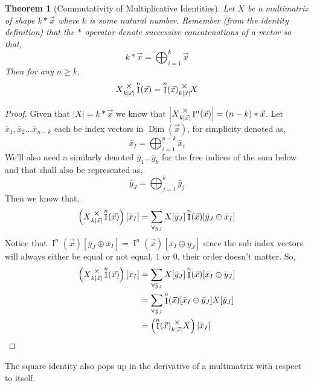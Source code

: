 \documentclass[12pt]{book}
\theoremstyle{plain}
\newtheorem{theorem}{Theorem}[chapter]
\theoremstyle{definition}
\theoremstyle{ppart}
\theoremstyle{case}
\theoremstyle{solution}
\DeclareMathOperator{\Dim}{Dim}
\DeclareMathOperator{\Ident}{I}
\newcommand{\mmult}[1]{\text{\raisebox{1ex}{$\underset{#1}{\times}$}}}
\newcommand{\shape}[1]{\left|#1\right|}
\begin{document}
\begin{theorem}[Commutativity of Multiplicative Identities]
\label{ident_commute}
Let $X$ be a multimatrix of shape $k * \vec{x}$ where $k$ is some natural number.
Remember (from the identity definition) that the $*$ operator denote successive concatenations of a vector so that,
\[ k * \vec{x} = \bigoplus_{i=1}^k \vec{x} \]
Then for any $n \ge k$,
\[ X \mmult{k \shape{\vec{x}}} \Ident^n(\vec{x}) = \Ident^n(\vec{x}) \mmult{k \shape{\vec{x}}} X \]
\end{theorem}
\begin{proof}
Given that $\shape{X} = k * \vec{x}$ we know that
$\shape{X \mmult{k \shape{\vec{x}}} \Ident^n(\vec{x})} = (n-k) * \vec{x}$.
Let $\bar{x}_1, \bar{x}_2 \ldots \bar{x}_{n-k}$ each be index vectors in $\Dim(\vec{x})$,
for simplicity denoted as,
\[ \bar{x}_I = \bigoplus_{i=1}^{n-k} \bar{x}_i \]
We'll also need a similarly denoted $\bar{y}_1 \ldots \bar{y}_k$ for the free indices of
the sum below and that shall also be represented as,
\[ \bar{y}_J = \bigoplus_{j=1}^{k} \bar{y}_j \]
Then we know that,
\[
  \left(X \mmult{k \shape{\vec{x}}} \Ident^n(\vec{x}) \right)[\bar{x}_I]
  = \sum_{\forall \bar{y}_J} X[\bar{y}_J] \Ident^n(\vec{x})[\bar{y}_J \oplus \bar{x}_I]
\]
Notice that $\Ident^n(\vec{x})[\bar{y}_J \oplus \bar{x}_I] = \Ident^n(\vec{x})[\bar{x}_I \oplus \bar{y}_J]$
since the sub index vectors will always either be equal or not equal, $1$ or $0$, their order doesn't matter.
So,
\begin{align*}
  \left(X \mmult{k \shape{\vec{x}}} \Ident^n(\vec{x}) \right)[\bar{x}_I]
  &= \sum_{\forall \bar{y}_J} X[\bar{y}_J] \Ident^n(\vec{x})[\bar{x}_I \oplus \bar{y}_J] \\
  &= \sum_{\forall \bar{y}_J} \Ident^n(\vec{x})[\bar{x}_I \oplus \bar{y}_J] X[\bar{y}_J] \\
  &= \left(\Ident^n(\vec{x}) \mmult{k \shape{\vec{x}}} X \right)[\bar{x}_I]
\end{align*}
\end{proof}

The square identity also pops up in the derivative of a multimatrix
with respect to itself.
\end{document}
